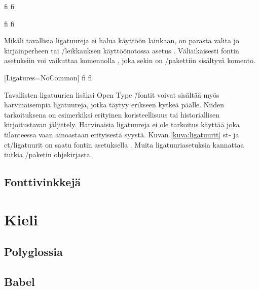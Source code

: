 \pagebreak[3]

\begin{koodilohkosis}
  fi f\textcompwordmark i
\end{koodilohkosis}

\begin{tulossis}
  fi f\textcompwordmark i
\end{tulossis}

Mikäli tavallisia ligatuureja ei halua käyttöön lainkaan, on parasta
valita jo kirjainperheen tai \=/leikkauksen käyttöönotossa asetus
. Väliaikaisesti fontin asetuksiin voi
vaikuttaa komennolla , joka sekin on
\-/pakettiin sisältyvä komento.

\begin{koodilohkosis}
  \setmainfont{…}[Ligatures=NoCommon] %
  { fi fl} %
\end{koodilohkosis}

Tavallisten ligatuurien lisäksi Open Type \=/fontit voivat sisältää myös
harvinaisempia ligatuureja, jotka täytyy erikseen kytkeä päälle. Niiden
tarkoituksena on esimerkiksi erityinen koristeellisuus tai
historiallisen kirjoitustavan jäljittely. Harvinaisia ligatuureja ei ole
tarkoitus käyttää joka tilanteessa vaan ainoastaan erityisestä syystä.
Kuvan \ref{kuva:ligatuurit} st- ja ct\-/ligatuurit on saatu fontin
asetuksella . Muita
li\-ga\-tuu\-ri\-ase\-tuk\-sia kannattaa tutkia
\-/paketin ohjekirjasta.

\subsection{Fonttivinkkejä}

\section{Kieli}
\label{luku:kieliasetukset}

\subsection{Polyglossia}
\subsection{Babel}
